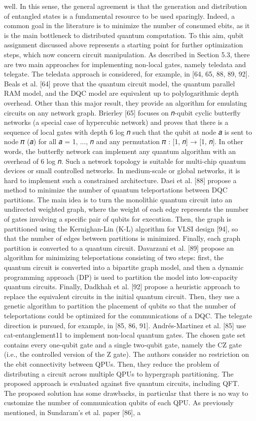 well. In this sense, the general agreement is that the generation and distribution of entangled states is a fundamental resource to be used sparingly. Indeed, a common goal in the literature is to minimize the number of consumed ebits, as it is the main bottleneck to distributed quantum computation. To this aim, qubit assignment discussed above represents a starting point for further optimization steps, which now concern circuit manipulation. As described in Section 5.3, there are two main approaches for implementing non-local gates, namely teledata and telegate. The teledata approach is considered, for example, in [64, 65, 88, 89, 92]. Beals et al. [64] prove that the quantum circuit model, the quantum parallel RAM model, and the DQC model are equivalent up to polylogarithmic depth overhead. Other than this major result, they provide an algorithm for emulating circuits on any network graph. Brierley [65] focuses on 𝑛-qubit cyclic butterfly networks (a special case of hypercubic network) and proves that there is a sequence of local gates with depth 6 log 𝑛 such that the qubit at node 𝑎 is sent to node 𝜋 (𝑎) for all 𝑎 = 1, ..., 𝑛 and any permutation 𝜋 : [1, 𝑛] → [1, 𝑛]. In other words, the butterfly network can implement any quantum algorithm with an overhead of 6 log 𝑛. Such a network topology is suitable for multi-chip quantum devices or small controlled networks. In medium-scale or global networks, it is hard to implement such a constrained architecture. Daei et al. [88] propose a method to minimize the number of quantum teleportations between DQC partitions. The main idea is to turn the monolithic quantum circuit into an undirected weighted graph, where the weight of each edge represents the number of gates involving a specific pair of qubits for execution. Then, the graph is partitioned using the Kernighan-Lin (K-L) algorithm for VLSI design [94], so that the number of edges between partitions is minimized. Finally, each graph partition is converted to a quantum circuit. Davarzani et al. [89] propose an algorithm for minimizing teleportations consisting of two steps: first, the quantum circuit is converted into a bipartite graph model, and then a dynamic programming approach (DP) is used to partition the model into low-capacity quantum circuits. Finally, Dadkhah et al. [92] propose a heuristic approach to replace the equivalent circuits in the initial quantum circuit. Then, they use a genetic algorithm to partition the placement of qubits so that the number of teleportations could be optimized for the communications of a DQC. The telegate direction is pursued, for example, in [85, 86, 91]. Andrés-Martinez et al. [85] use cat-entanglement11 to implement non-local quantum gates. The chosen gate set contains every one-qubit gate and a single two-qubit gate, namely the CZ gate (i.e., the controlled version of the Z gate). The authors consider no restriction on the ebit connectivity between QPUs. Then, they reduce the problem of distributing a circuit across multiple QPUs to hypergraph partitioning. The proposed approach is evaluated against five quantum circuits, including QFT. The proposed solution has some drawbacks, in particular that there is no way to customize the number of communication qubits of each QPU. As previously mentioned, in Sundaram’s et al. paper [86], a 